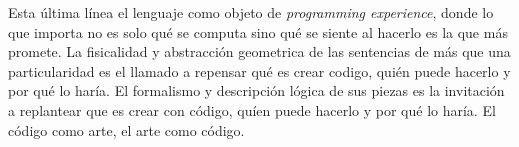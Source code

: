 Esta \'ultima l\'inea el lenguaje como objeto de \emph{programming
experience}, donde lo que importa no es solo qu\'e se computa sino
qu\'e se siente al hacerlo es la que m\'as promete. 
La fisicalidad y abstracci\'on geometrica de las sentencias de \sculpt
m\'as que una particularidad es el llamado
a repensar qu\'e es crear codigo, qui\'en puede hacerlo y por qu\'e lo har\'ia.
El formalismo y descripci\'on l\'ogica de sus piezas es la invitaci\'on a replantear
que es crear con c\'odigo, qu\'ien puede hacerlo y por qu\'e lo har\'ia.
El c\'odigo como arte, el arte como c\'odigo.

\endinput

